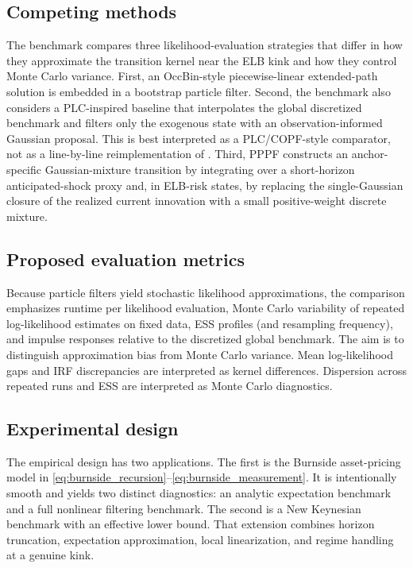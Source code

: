 \documentclass[11pt]{article}
\theoremstyle{remark}
\begin{document}
\subsection{Competing methods}

The benchmark compares three likelihood-evaluation strategies that differ in how they approximate the transition kernel near the ELB kink and how they control Monte Carlo variance.
First, an OccBin-style piecewise-linear extended-path solution \citep{GuerrieriIacoviello2015} is embedded in a bootstrap particle filter.
Second, the benchmark also considers a PLC-inspired baseline that interpolates the global discretized benchmark and filters only the exogenous state with an observation-informed Gaussian proposal.
This is best interpreted as a PLC/COPF-style comparator, not as a line-by-line reimplementation of \citet{AruobaCubaBordaHigaFloresSchorfheideVillalvazo2021}.
Third, PPPF constructs an anchor-specific Gaussian-mixture transition by integrating over a short-horizon anticipated-shock proxy and, in ELB-risk states, by replacing the single-Gaussian closure of the realized current innovation with a small positive-weight discrete mixture.

\subsection{Proposed evaluation metrics}

Because particle filters yield stochastic likelihood approximations, the comparison emphasizes runtime per likelihood evaluation, Monte Carlo variability of repeated log-likelihood estimates on fixed data, ESS profiles (and resampling frequency), and impulse responses relative to the discretized global benchmark.
The aim is to distinguish approximation bias from Monte Carlo variance.
Mean log-likelihood gaps and IRF discrepancies are interpreted as kernel differences.
Dispersion across repeated runs and ESS are interpreted as Monte Carlo diagnostics.

\subsection{Experimental design}

The empirical design has two applications.
The first is the Burnside asset-pricing model in \eqref{eq:burnside_recursion}--\eqref{eq:burnside_measurement}.
It is intentionally smooth and yields two distinct diagnostics: an analytic expectation benchmark and a full nonlinear filtering benchmark.
The second is a New Keynesian benchmark with an effective lower bound.
That extension combines horizon truncation, expectation approximation, local linearization, and regime handling at a genuine kink.
\end{document}

